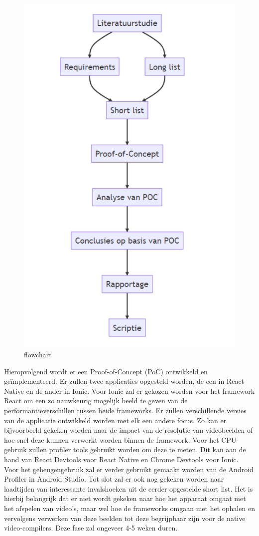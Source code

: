 \begin{figure}
  \centering
  \includegraphics[width=0.7\linewidth]{img/flowchart}
  \caption{flowchart}
  \label{fig:flowchart}
\end{figure}

Hieropvolgend wordt er een Proof-of-Concept (PoC) ontwikkeld en geïmplementeerd. Er zullen twee applicaties opgesteld worden, de een in React Native en de ander in Ionic. Voor Ionic zal er gekozen worden voor het framework React om een zo nauwkeurig mogelijk beeld te geven van de performantieverschillen tussen beide frameworks. Er zullen verschillende versies van de applicatie ontwikkeld worden met elk een andere focus. Zo kan er bijvoorbeeld gekeken worden naar de impact van de resolutie van videobeelden of hoe snel deze kunnen verwerkt worden binnen de framework. Voor het CPU-gebruik zullen profiler tools gebruikt worden om deze te meten. Dit kan aan de hand van React Devtools voor React Native en Chrome Devtools voor Ionic. Voor het geheugengebruik zal er verder gebruikt gemaakt worden van de Android Profiler in Android Studio. Tot slot zal er ook nog gekeken worden naar laadtijden van interessante invalshoeken uit de eerder opgestelde short list. Het is hierbij belangrijk dat er niet wordt gekeken naar hoe het apparaat omgaat met het afspelen van video's, maar wel hoe de frameworks omgaan met het ophalen en vervolgens verwerken van deze beelden tot deze begrijpbaar zijn voor de native video-compilers. Deze fase zal ongeveer 4-5 weken duren.

